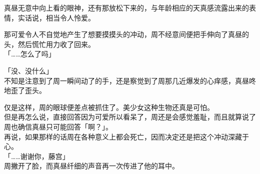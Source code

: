 真昼无意中向上看的眼神，还有那放松下来的，与年龄相应的天真感流露出来的表情，实话说，相当令人怜爱。

那可爱令人不自觉地产生了想要摸摸头的冲动，周不经意间便把手伸向了真昼的头，然后慌忙用力收了回来。\\

「……怎么了吗」

「没、没什么」\\

不知是注意到了周一瞬间动了的手，还是察觉到了周那几近爆发的心痒感，真昼咚地歪了歪头。

仅是这样，周的眼球便差点被抓住了。美少女这种生物还真是可怕。\\

但是再怎么说，直接回答因为可爱所以看呆了，周还是会感觉羞耻，而且就算说了周也确信真昼只可能回答「啊？」。\\

再说，如果那样的话周在各种意义上都会死亡，因而决定还是把这个冲动深藏于心。\\

「……谢谢你，藤宫」\\

周撇开了脸，而真昼纤细的声音再一次传进了他的耳中。

